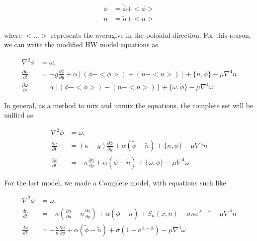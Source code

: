 \documentclass{hitec} %
\begin{document}
\begin{subequations}
\begin{align}
\phi & = \tilde{\phi} + <\phi> \\
n & = \tilde{n} + <n>
\end{align}
\end{subequations}

where $<...>$ represents the averagive in the poloidal direction. For this reason, we can write the modified HW model equations as

\begin{subequations}
\begin{align}
 \nabla^2 \phi & =  \omega, \quad \\
 \frac{\partial n}{\partial t}    & = - g \frac{\partial \phi}{\partial y} + \alpha [(\phi - <\phi>) - (n - <n>)]
 + \{n, \phi\} - \mu \nabla^4 n \\
  \frac{\partial \omega}{\partial t} & = \alpha [(\phi - <\phi>) - (n - <n>)]  + \{ \omega, \phi\}
  - \mu\nabla^4\omega
\end{align}
\end{subequations}


In general, as a method to mix and unmix the equations, the complete set will be unified as

\begin{subequations}
\begin{align}
 \nabla^2 \phi & =  \omega, \quad \\
 \frac{\partial n}{\partial t}     & = (\kappa - g) \frac{\partial \phi}{\partial y} + \alpha (\tilde{\phi} - \tilde{n})
 + \{n, \phi\} - \mu \nabla^4 n \\
  \frac{\partial \omega}{\partial t} & =  - \kappa\frac{\partial n}{\partial y} + \alpha ( \tilde{\phi} - \tilde{n}) + \{ \omega, \phi\}
- \mu\nabla^4\omega
\end{align}
\end{subequations}


For the last model, we made a Complete model, with equations such like:

\begin{subequations}
\begin{align}
 \nabla^2 \phi & =  \omega, \quad  \\
 \frac{d n}{d t} & = -\kappa \left(\frac{\partial n}{\partial y} - n \frac{\partial \phi}{\partial y}\right) + \alpha (\tilde{\phi} - \tilde{n}) + S_n(x, n) - \sigma n e^{\Lambda - \phi} - \mu \nabla^4 n  \\
  \frac{d \omega}{d  t} & =  - \frac{\kappa}{n}\frac{\partial n}{\partial y} + \alpha ( \tilde{\phi} - \tilde{n}) +\sigma\left(1-e^{\Lambda-\phi}\right) - \mu\nabla^4\omega
\end{align}
\end{subequations}
\end{document}
